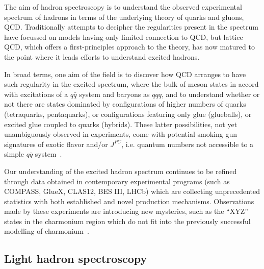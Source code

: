 


 
The aim of hadron spectroscopy is to understand the observed experimental spectrum of hadrons in terms of the underlying theory of quarks and gluons, QCD. Traditionally attempts to decipher the regularities present in the spectrum have focussed on models having only limited connection to QCD, but lattice QCD, which offers a first-principles approach to the theory, has now matured to the point where it leads efforts to understand excited hadrons.

In broad terms, one aim of the field is to discover how QCD arranges to have such regularity in the excited spectrum, where the bulk of meson states in accord with excitations of a $q\bar{q}$ system and baryons as $qqq$, and to understand whether or not there are states dominated by configurations of higher numbers of quarks (tetraquarks, pentaquarks), or configurations featuring only glue (glueballs), or excited glue coupled to quarks (hybrids). These latter possibilities, not yet unambiguously observed in experiments, come with potential smoking gun signatures of exotic flavor and/or $J^{PC}$, i.e. quantum numbers not accessible to a simple $q\bar{q}$ system~\cite{Meyer:2015eta}.

Our understanding of the excited hadron spectrum continues to be refined through data obtained in contemporary experimental programs (such as COMPASS, GlueX, CLAS12, BES III, LHCb) which are collecting unprecedented statistics with both established and novel production mechanisms. Observations made by these experiments are introducing new mysteries, such as the ``XYZ'' states in the charmonium region which do not fit into the previously successful modelling of charmonium~\cite{Lebed:2016hpi}.



\subsection{Light hadron spectroscopy}

